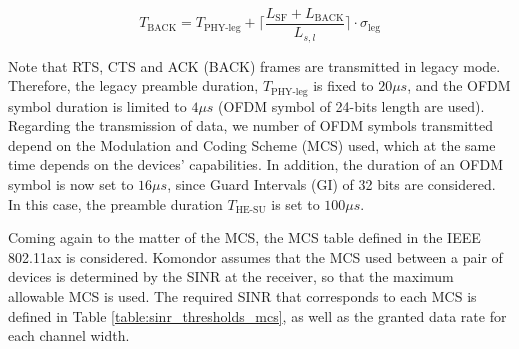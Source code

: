 \documentclass[a4paper]{article}
\begin{document}
	\begin{equation}
	T_{\text{BACK}} = T_{\text{PHY-leg}} + \lceil \frac{L_{\text{SF}} +  L_{\text{BACK}}}{L_{s,l}} \rceil \cdot \sigma_{\text{leg}}
	\nonumber
	\end{equation}
	
	Note that RTS, CTS and ACK (BACK) frames are transmitted in legacy mode. Therefore, the legacy preamble duration, $T_{\text{PHY-leg}}$ is fixed to $20 \mu s$, and the OFDM symbol duration is limited to $4 \mu s$ (OFDM symbol of 24-bits length are used). Regarding the transmission of data, we number of OFDM symbols transmitted depend on the Modulation and Coding Scheme (MCS) used, which at the same time depends on the devices' capabilities. In addition, the duration of an OFDM symbol is now set to $16 \mu s$, since Guard Intervals (GI) of 32 bits are considered. In this case, the preamble duration $T_{\text{HE-SU}} $ is set to $100 \mu s$.
	
	Coming again to the matter of the MCS, the MCS table defined in the IEEE 802.11ax is considered. Komondor assumes that the MCS used between a pair of devices is determined by the SINR at the receiver, so that the maximum allowable MCS is used. The required SINR that corresponds to each MCS is defined in Table \ref{table:sinr_thresholds_mcs}, as well as the granted data rate for each channel width.
\end{document}
